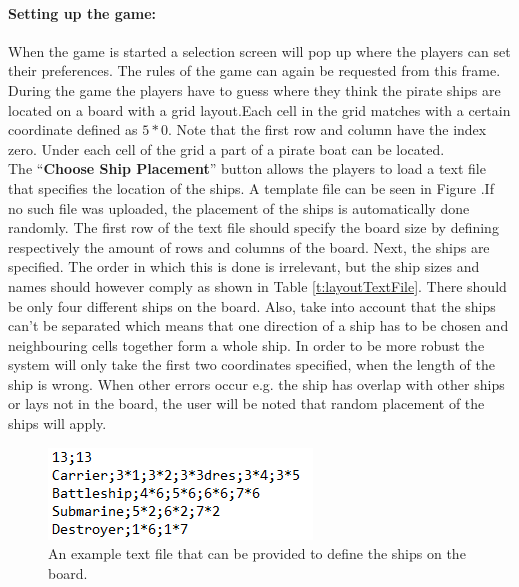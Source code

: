 \documentclass[a4paper,10pt]{article}
\begin{document}
\paragraph{Setting up the game:}
When the game is started a selection screen will pop up where the players can set their preferences. The rules of the game can again be requested from this frame. During the game the players have to guess where they think the pirate ships are located on a board with a grid layout.Each cell in the grid matches with a certain coordinate defined as $ 5*0 $. Note that the first row and column have the index zero. Under each cell of the grid a part of a pirate boat can be located.\\
The ``\textbf{Choose Ship Placement}'' button allows the players to load a text file that specifies the location of the ships. A template file can be seen in Figure \label{f:template}.If no such file was uploaded, the placement of the ships is automatically done randomly. The first row of the text file should specify the board size by defining respectively the amount of rows and columns of the board. Next, the ships are specified. The order in which this is done is irrelevant, but the ship sizes and names should however comply as shown in Table \ref{t:layoutTextFile}. There should be only four different ships on the board. Also, take into account that the ships can't be separated which means that one direction of a ship has to be chosen and neighbouring cells together form a whole ship. In order to be more robust the system will only take the first two coordinates specified, when the length of the ship is wrong. When other errors occur e.g. the ship has overlap with other ships or lays not in the board, the user will be noted that random placement of the ships will apply.\\

\begin{figure}[h!]
	\begin{center}
		\includegraphics[]{template.PNG}
	\end{center}	
	\caption{An example text file that can be provided to define the ships on the board.}
	\label{f:template}
\end{figure}
\end{document}
